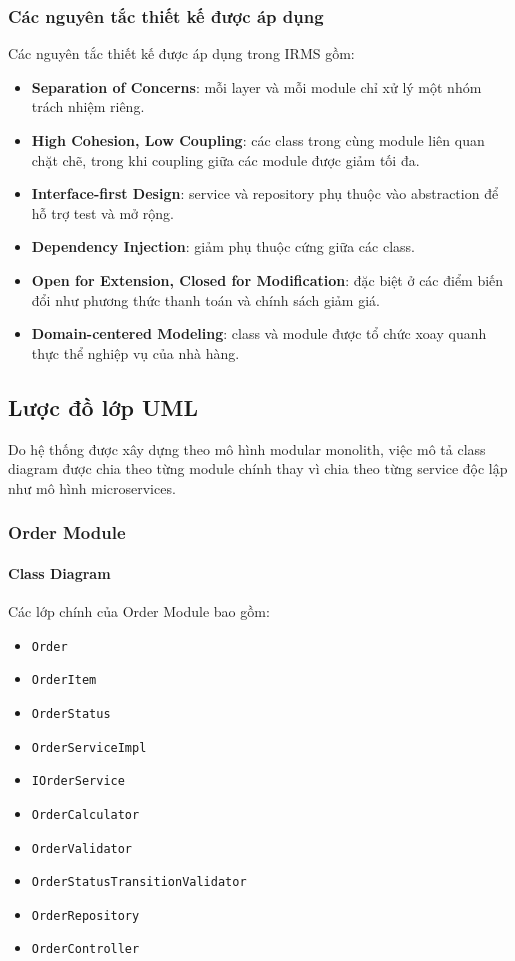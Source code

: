 \documentclass[12pt,a4paper]{article}
\begin{document}
\subsubsection{Các nguyên tắc thiết kế được áp dụng}

Các nguyên tắc thiết kế được áp dụng trong IRMS gồm:
\begin{itemize}
    \item \textbf{Separation of Concerns}: mỗi layer và mỗi module chỉ xử lý một nhóm trách nhiệm riêng.
    \item \textbf{High Cohesion, Low Coupling}: các class trong cùng module liên quan chặt chẽ, trong khi coupling giữa các module được giảm tối đa.
    \item \textbf{Interface-first Design}: service và repository phụ thuộc vào abstraction để hỗ trợ test và mở rộng.
    \item \textbf{Dependency Injection}: giảm phụ thuộc cứng giữa các class.
    \item \textbf{Open for Extension, Closed for Modification}: đặc biệt ở các điểm biến đổi như phương thức thanh toán và chính sách giảm giá.
    \item \textbf{Domain-centered Modeling}: class và module được tổ chức xoay quanh thực thể nghiệp vụ của nhà hàng.
\end{itemize}

\subsection{Lược đồ lớp UML}

Do hệ thống được xây dựng theo mô hình modular monolith, việc mô tả class diagram được chia theo từng module chính thay vì chia theo từng service độc lập như mô hình microservices.

\subsubsection{Order Module}

\paragraph{Class Diagram}
Các lớp chính của Order Module bao gồm:
\begin{itemize}
    \item \texttt{Order}
    \item \texttt{OrderItem}
    \item \texttt{OrderStatus}
    \item \texttt{OrderServiceImpl}
    \item \texttt{IOrderService}
    \item \texttt{OrderCalculator}
    \item \texttt{OrderValidator}
    \item \texttt{OrderStatusTransitionValidator}
    \item \texttt{OrderRepository}
    \item \texttt{OrderController}
\end{itemize}
\end{document}
